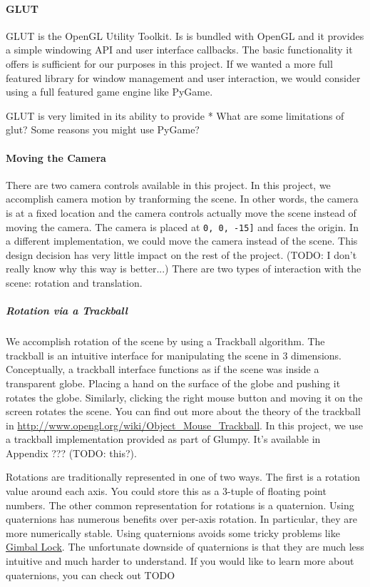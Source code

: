 \documentclass[11pt,draft]{article}
\begin{document}
\paragraph{GLUT}
GLUT is the OpenGL Utility Toolkit. Is is bundled with OpenGL and it provides a simple windowing API and user interface callbacks. The basic functionality it
offers is sufficient for our purposes in this project. If we wanted a more full featured library for window management and user interaction, we would consider using
a full featured game engine like PyGame.

GLUT is very limited in its ability to provide
* What are some limitations of glut? Some reasons you might use PyGame?

\paragraph{Moving the Camera}
There are two camera controls available in this project. In this project, we accomplish camera motion by tranforming the scene. In other words, the
camera is at a fixed location and the camera controls actually move the scene instead of moving the camera. The camera is placed at \lstinline$0, 0, -15]$ and
faces the origin. In a different implementation, we could move the camera instead of the scene.
This design decision has very little impact on the rest of the project. (TODO: I don't really know why this way is better...)
There are two types of interaction with the scene: rotation and translation.

\subparagraph{Rotation via a Trackball}
We accomplish rotation of the scene by using a Trackball algorithm. The trackball is an intuitive interface for manipulating the scene in 3 dimensions.
Conceptually, a trackball interface functions as if the scene was inside a transparent globe. Placing a hand on the surface of the globe and pushing it rotates the globe. Similarly, clicking the right mouse button and moving it on the screen rotates the scene.
You can find out more about the theory of the trackball in \url{http://www.opengl.org/wiki/Object_Mouse_Trackball}.
In this project, we use a trackball implementation provided as part of Glumpy. It's available in Appendix ??? (TODO: this?).

Rotations are traditionally represented in one of two ways. The first is a rotation value around each axis. You could store this as a 3-tuple of floating point numbers.
The other common representation for rotations is a quaternion. Using quaternions has numerous benefits over per-axis rotation. In particular, they are more numerically stable. Using quaternions avoids some tricky problems like \href{http://en.wikipedia.org/wiki/Gimbal_lock}{Gimbal Lock}.
The unfortunate downside of quaternions is that they are much less intuitive and much harder to understand. If you would like to learn more about quaternions, you can check out TODO
\end{document}
